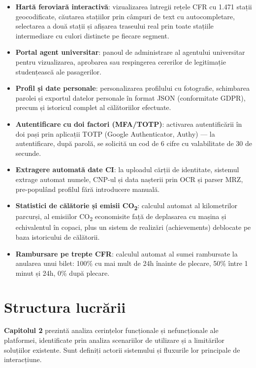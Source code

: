 \documentclass[12pt,a4paper]{report}
\begin{document}
\begin{itemize}
  \item \textbf{Hartă feroviară interactivă}: vizualizarea întregii rețele CFR cu 1.471 stații geocodificate, căutarea stațiilor prin câmpuri de text cu autocompletare, selectarea a două stații și afișarea traseului real prin toate stațiile intermediare cu culori distincte pe fiecare segment.

  \item \textbf{Portal agent universitar}: panoul de administrare al agentului universitar pentru vizualizarea, aprobarea sau respingerea cererilor de legitimație studențească ale pasagerilor.

  \item \textbf{Profil și date personale}: personalizarea profilului cu fotografie, schimbarea parolei și exportul datelor personale în format JSON (conformitate GDPR), precum și istoricul complet al călătoriilor efectuate.

  \item \textbf{Autentificare cu doi factori (MFA/TOTP)}: activarea autentificării în doi pași prin aplicații TOTP (Google Authenticator, Authy) — la autentificare, după parolă, se solicită un cod de 6 cifre cu valabilitate de 30 de secunde.

  \item \textbf{Extragere automată date CI}: la uploadul cărții de identitate, sistemul extrage automat numele, CNP-ul și data nașterii prin OCR și parser MRZ, pre-populând profilul fără introducere manuală.

  \item \textbf{Statistici de călătorie și emisii CO\textsubscript{2}}: calculul automat al kilometrilor parcurși, al emisiilor CO\textsubscript{2} economisite față de deplasarea cu mașina și echivalentul în copaci, plus un sistem de realizări (achievements) deblocate pe baza istoricului de călătorii.

  \item \textbf{Rambursare pe trepte CFR}: calculul automat al sumei rambursate la anularea unui bilet: 100\% cu mai mult de 24h înainte de plecare, 50\% între 1 minut și 24h, 0\% după plecare.
\end{itemize}

\section{Structura lucrării}

\textbf{Capitolul 2} prezintă analiza cerințelor funcționale și nefuncționale ale platformei, identificate prin analiza scenariilor de utilizare și a limitărilor soluțiilor existente. Sunt definiți actorii sistemului și fluxurile lor principale de interacțiune.
\end{document}
